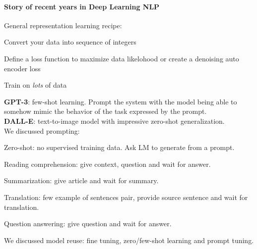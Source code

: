 \documentclass[10pt]{report}
\begin{document}
\paragraph{Story of recent years in Deep Learning NLP} General representation learning recipe:
\begin{list}{}{}
	\item Convert your data into sequence of integers
	\item Define a loss function to maximize data likelohood or create a denoising auto encoder loss
	\item Train on \textit{lots} of data
\end{list}
\textbf{GPT-3}: few-shot learning. Prompt the system with the model being able to somehow mimic the behavior of the task expressed by the prompt.\\
\textbf{DALL-E}: text-to-image model with impressive zero-shot generalization.\\
We discussed prompting:
\begin{list}{}{}
	\item Zero-shot: no supervised training data. Ask LM to generate from a prompt.
	\item Reading comprehension: give context, question and wait for answer.
	\item Summarization: give article and wait for summary.
	\item Translation: few example of sentences pair, provide source sentence and wait for translation.
	\item Question answering: give question and wait for answer.
\end{list}
We discussed model reuse: fine tuning, zero/few-shot learning and prompt tuning.
\end{document}
